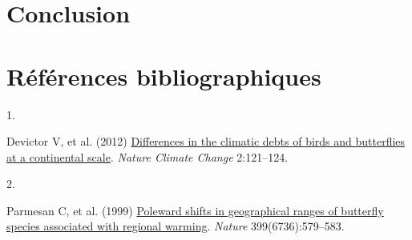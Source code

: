 \documentclass[9pt,twocolumn,twoside,]{pnas-new}
\newlength{\cslhangindent}
\newlength{\csllabelwidth}
\newenvironment{CSLReferences}[2] %
 {\begin{list}{}{%
  \setlength{\itemindent}{0pt}
  \setlength{\leftmargin}{0pt}
  \setlength{\parsep}{0pt}
  \ifodd #1
   \setlength{\leftmargin}{\cslhangindent}
   \setlength{\itemindent}{-1\cslhangindent}
  \fi
  \setlength{\itemsep}{#2\baselineskip}}}
 {\end{list}}
\newcommand{\CSLLeftMargin}[1]{\parbox[t]{\csllabelwidth}{#1}}
\newcommand{\CSLRightInline}[1]{\parbox[t]{\linewidth - \csllabelwidth}{#1}\break}
\begin{document}
\section{Conclusion}\label{conclusion}

\section{Références
bibliographiques}\label{ruxe9fuxe9rences-bibliographiques}

\showmatmethods
\pnasbreak

\label{refs}
\begin{CSLReferences}{0}{1}
\CSLLeftMargin{1. }%
\CSLRightInline{Devictor V, et al. (2012)
\href{https://doi.org/10.1038/NCLIMATE1347}{Differences in the climatic
debts of birds and butterflies at a continental scale}. \emph{Nature
Climate Change} 2:121--124.}

\CSLLeftMargin{2. }%
\CSLRightInline{Parmesan C, et al. (1999)
\href{https://doi.org/10.1038/21181}{Poleward shifts in geographical
ranges of butterfly species associated with regional warming}.
\emph{Nature} 399(6736):579--583.}

\end{CSLReferences}



% 
\end{document}
